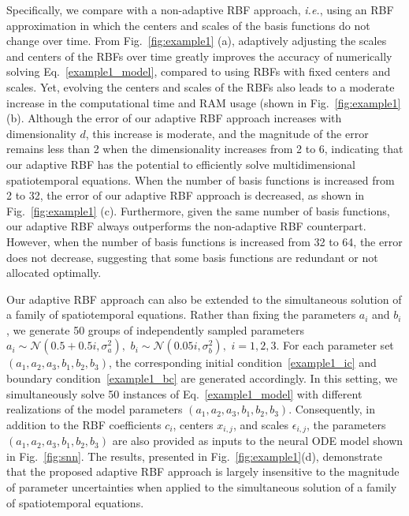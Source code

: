 \begin{example}
Specifically, we compare with a non-adaptive RBF approach, \textit{i.e.}, using an RBF approximation in which the centers and scales of the basis functions do not change over time. From Fig.~\ref{fig:example1} (a), adaptively adjusting the scales and centers of the RBFs over time greatly improves the accuracy of numerically solving Eq.~\eqref{example1_model}, compared to using RBFs with fixed centers and scales. 
Yet, evolving the centers and scales of the RBFs also leads to a moderate increase in the computational time and RAM usage (shown in Fig.~\ref{fig:example1} (b). Although the error of our adaptive RBF approach increases with dimensionality $d$, this increase is moderate, and the magnitude of the error remains less than 2 when the dimensionality increases from 2 to 6, indicating that our adaptive RBF has the potential to efficiently solve multidimensional spatiotemporal equations. When the number of basis functions is increased from 2 to 32, the error of our adaptive RBF approach is decreased, as shown in Fig.~\ref{fig:example1} (c). Furthermore, given the same number of basis functions, our adaptive RBF always outperforms the non-adaptive RBF counterpart. However, when the number of basis functions is increased from 32 to 64, the error does not decrease, suggesting that some basis functions are redundant or not allocated optimally.

Our adaptive RBF approach can also be extended to the simultaneous solution of a family of spatiotemporal equations. Rather than fixing the parameters $a_i$ and $b_i$, we generate 50 groups of independently sampled parameters
$a_i \sim \mathcal{N}(0.5 + 0.5 i, \sigma_a^2), \,\, 
b_i \sim \mathcal{N}(0.05 i, \sigma_b^2), \,\, i = 1, 2, 3$.
For each parameter set $(a_1,a_2,a_3,b_1,b_2,b_3)$, the corresponding initial condition~\eqref{example1_ic} and boundary condition~\eqref{example1_bc} are generated accordingly. In this setting, we simultaneously solve 50 instances of Eq.~\eqref{example1_model} with different realizations of the model parameters $(a_1,a_2,a_3,b_1,b_2,b_3)$. 
Consequently, in addition to the RBF coefficients $c_i$, centers $x_{i,j}$, and scales $\epsilon_{i,j}$, the parameters $(a_1,a_2,a_3,b_1,b_2,b_3)$ are also provided as inputs to the neural ODE model shown in Fig.~\ref{fig:snn}. The results, presented in Fig.~\ref{fig:example1}(d), demonstrate that the proposed adaptive RBF approach is largely insensitive to the magnitude of parameter uncertainties when applied to the simultaneous solution of a family of spatiotemporal equations.



\end{example}
